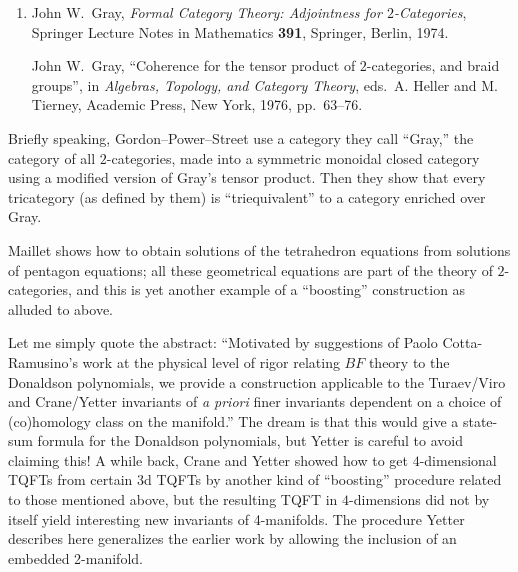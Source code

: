 \documentclass[12pt]{article}
\def\tightlist{}
\renewcommand{\texttt}[1]{%
  \begingroup
  \ttfamily
  \begingroup\lccode`~=`/\lowercase{\endgroup\def~}{/\discretionary{}{}{}}%
  \begingroup\lccode`~=`[\lowercase{\endgroup\def~}{[\discretionary{}{}{}}%
  \begingroup\lccode`~=`.\lowercase{\endgroup\def~}{.\discretionary{}{}{}}%
  \catcode`/=\active\catcode`[=\active\catcode`.=\active
  \scantokens{#1\noexpand}%
  \endgroup
}
\begin{document}
\begin{enumerate}
\def\labelenumi{\arabic{enumi})}
\setcounter{enumi}{2}
\item
   John W.\ Gray, \emph{Formal Category Theory: Adjointness for \(2\)-Categories}, 
  Springer Lecture Notes in Mathematics \textbf{391},
  Springer, Berlin, 1974.

    John W.\ Gray, ``Coherence for the tensor product of \(2\)-categories, and braid
  groups'', in \emph{Algebras, Topology, and Category Theory}, eds.~A.
  Heller and M. Tierney, Academic Press, New York, 1976, pp.~63--76.
\end{enumerate}

Briefly speaking, Gordon--Power--Street use a category they call ``Gray,''
the category of all \(2\)-categories, made into a symmetric monoidal
closed category using a modified version of Gray's tensor product. Then
they show that every tricategory (as defined by them) is
``triequivalent'' to a category enriched over Gray.


Maillet shows how to obtain solutions of the tetrahedron equations from
solutions of pentagon equations; all these geometrical equations are
part of the theory of \(2\)-categories, and this is yet another example
of a ``boosting'' construction as alluded to above.


Let me simply quote the abstract: ``Motivated by suggestions of Paolo
Cotta-Ramusino's work at the physical level of rigor relating \(BF\)
theory to the Donaldson polynomials, we provide a construction
applicable to the Turaev/Viro and Crane/Yetter invariants of \emph{a
priori} finer invariants dependent on a choice of (co)homology class on
the manifold.'' The dream is that this would give a state-sum formula
for the Donaldson polynomials, but Yetter is careful to avoid claiming
this! A while back, Crane and Yetter showed how to get \(4\)-dimensional
TQFTs from certain 3d TQFTs by another kind of ``boosting'' procedure
related to those mentioned above, but the resulting TQFT in
\(4\)-dimensions did not by itself yield interesting new invariants of
4-manifolds. The procedure Yetter describes here generalizes the earlier
work by allowing the inclusion of an embedded 2-manifold.
\end{document}
